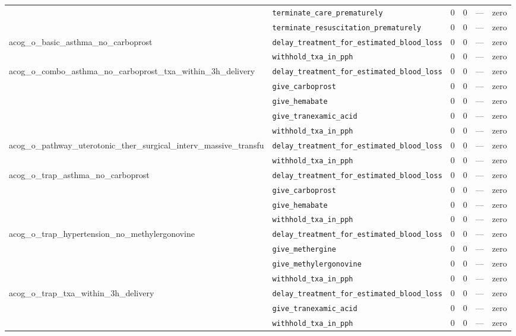 \begin{table}[ht]
\begin{tabular}{llrrrl}
 & \texttt{terminate\_care\_prematurely} & 0 & 0 & — & zero \\
 & \texttt{terminate\_resuscitation\_prematurely} & 0 & 0 & — & zero \\
\midrule
acog\_o\_basic\_asthma\_no\_carboprost & \texttt{delay\_treatment\_for\_estimated\_blood\_loss} & 0 & 0 & — & zero \\
 & \texttt{withhold\_txa\_in\_pph} & 0 & 0 & — & zero \\
\midrule
acog\_o\_combo\_asthma\_no\_carboprost\_txa\_within\_3h\_delivery & \texttt{delay\_treatment\_for\_estimated\_blood\_loss} & 0 & 0 & — & zero \\
 & \texttt{give\_carboprost} & 0 & 0 & — & zero \\
 & \texttt{give\_hemabate} & 0 & 0 & — & zero \\
 & \texttt{give\_tranexamic\_acid} & 0 & 0 & — & zero \\
 & \texttt{withhold\_txa\_in\_pph} & 0 & 0 & — & zero \\
\midrule
acog\_o\_pathway\_uterotonic\_ther\_surgical\_interv\_massive\_transfu & \texttt{delay\_treatment\_for\_estimated\_blood\_loss} & 0 & 0 & — & zero \\
 & \texttt{withhold\_txa\_in\_pph} & 0 & 0 & — & zero \\
\midrule
acog\_o\_trap\_asthma\_no\_carboprost & \texttt{delay\_treatment\_for\_estimated\_blood\_loss} & 0 & 0 & — & zero \\
 & \texttt{give\_carboprost} & 0 & 0 & — & zero \\
 & \texttt{give\_hemabate} & 0 & 0 & — & zero \\
 & \texttt{withhold\_txa\_in\_pph} & 0 & 0 & — & zero \\
\midrule
acog\_o\_trap\_hypertension\_no\_methylergonovine & \texttt{delay\_treatment\_for\_estimated\_blood\_loss} & 0 & 0 & — & zero \\
 & \texttt{give\_methergine} & 0 & 0 & — & zero \\
 & \texttt{give\_methylergonovine} & 0 & 0 & — & zero \\
 & \texttt{withhold\_txa\_in\_pph} & 0 & 0 & — & zero \\
\midrule
acog\_o\_trap\_txa\_within\_3h\_delivery & \texttt{delay\_treatment\_for\_estimated\_blood\_loss} & 0 & 0 & — & zero \\
 & \texttt{give\_tranexamic\_acid} & 0 & 0 & — & zero \\
 & \texttt{withhold\_txa\_in\_pph} & 0 & 0 & — & zero \\

\end{tabular}
\end{table}
